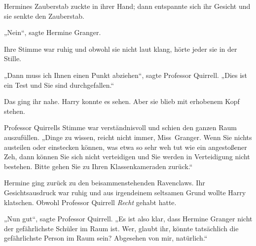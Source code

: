 Hermines Zauberstab zuckte in ihrer Hand; dann entspannte sich ihr Gesicht und sie senkte den Zauberstab.

„Nein“, sagte Hermine Granger.

Ihre Stimme war ruhig und obwohl sie nicht laut klang, hörte jeder sie in der Stille.

„Dann muss ich Ihnen einen Punkt abziehen“, sagte Professor Quirrell.
„Dies ist ein Test und Sie sind durchgefallen.“

Das ging ihr nahe. Harry konnte es sehen. Aber sie blieb mit erhobenem Kopf stehen.

Professor Quirrells Stimme war verständnisvoll und schien den ganzen Raum auszufüllen.
„Dinge zu wissen, reicht nicht immer, Miss~Granger. Wenn Sie nichts austeilen oder einstecken können, was etwa so sehr weh tut wie ein angestoßener Zeh, dann können Sie sich nicht verteidigen und Sie werden in Verteidigung nicht bestehen. Bitte gehen Sie zu Ihren Klassenkameraden zurück.“

Hermine ging zurück zu den beisammenstehenden Ravenclaws. Ihr Gesichtsausdruck war ruhig und aus irgendeinem seltsamen Grund wollte Harry klatschen. Obwohl Professor Quirrell \emph{Recht} gehabt hatte.

„Nun gut“, sagte Professor Quirrell.
„Es ist also klar, dass Hermine Granger nicht der gefährlichste Schüler im Raum ist. Wer, glaubt ihr, könnte tatsächlich die gefährlichste Person im Raum sein? Abgesehen von mir, natürlich.“


